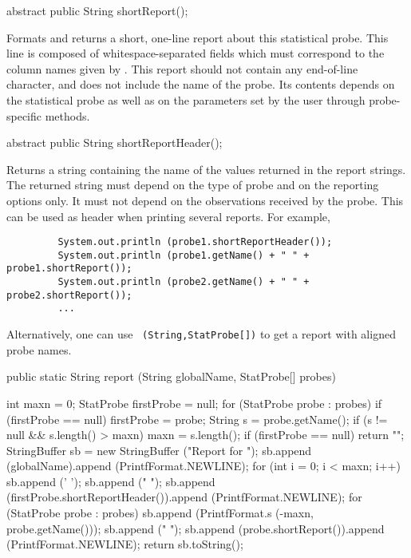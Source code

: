 \begin{code}

   abstract public String shortReport();
\end{code}
\begin{tabb}   Formats and returns a short, one-line report
 about this statistical probe.  This line is composed of
 whitespace-separated fields which must
 correspond to the column names given by .
  This report should not contain any end-of-line character, and does not
   include the name of the probe.
   Its contents depends on the statistical probe as well as  on the
   parameters set by the user through probe-specific methods.
\end{tabb}
\begin{htmlonly}
\end{htmlonly}
\begin{code}

   abstract public String shortReportHeader();
\end{code}
\begin{tabb}   Returns a string containing
 the name of the values returned in the report
 strings.  The returned string must depend on the type of probe and on
the reporting options only.  It must not depend on the observations
received by the probe.
This can be used as header when printing
 several reports. For example,
\begin{verbatim}
         System.out.println (probe1.shortReportHeader());
         System.out.println (probe1.getName() + " " + probe1.shortReport());
         System.out.println (probe2.getName() + " " + probe2.shortReport());
         ...
\end{verbatim}
  Alternatively, one can use ~\texttt{(String,StatProbe[])}
  to get a report with aligned probe names.
\end{tabb}
\begin{htmlonly}
\end{htmlonly}
\begin{code}

   public static String report (String globalName, StatProbe[] probes)\begin{hide} {
      int maxn = 0;
      StatProbe firstProbe = null;
      for (StatProbe probe : probes) {
         if (firstProbe == null)
            firstProbe = probe;
         String s = probe.getName();
         if (s != null && s.length() > maxn)
            maxn = s.length();
      }
      if (firstProbe == null)
         return "";
      StringBuffer sb = new StringBuffer ("Report for ");
      sb.append (globalName).append (PrintfFormat.NEWLINE);
      for (int i = 0; i < maxn; i++)
         sb.append (' ');
      sb.append ("   ");
      sb.append (firstProbe.shortReportHeader()).append (PrintfFormat.NEWLINE);
      for (StatProbe probe : probes) {
         sb.append
            (PrintfFormat.s (-maxn, probe.getName()));
         sb.append ("   ");
         sb.append (probe.shortReport()).append (PrintfFormat.NEWLINE);
      }
      return sb.toString();
   }\end{hide}
\end{code}
